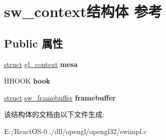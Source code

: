 \hypertarget{structsw__context}{}\section{sw\+\_\+context结构体 参考}
\label{structsw__context}
\subsection*{Public 属性}
\begin{DoxyCompactItemize}
\item 
\mbox{\label{structsw__context_ac7b659e59b721fcfaf5437e52c0de933}} 
\hyperlink{interfacestruct}{struct} \hyperlink{structgl__context}{gl\+\_\+context} {\bfseries mesa}
\item 
\mbox{\label{structsw__context_a1dd21bfc8abfb78310ee2a78116e2009}} 
H\+H\+O\+OK {\bfseries hook}
\item 
\mbox{\label{structsw__context_a663b8472923a4c818b051ef575d82e61}} 
\hyperlink{interfacestruct}{struct} \hyperlink{structsw__framebuffer}{sw\+\_\+framebuffer} {\bfseries framebuffer}
\end{DoxyCompactItemize}


该结构体的文档由以下文件生成\+:\begin{DoxyCompactItemize}
\item 
E\+:/\+React\+O\+S-\/0../dll/opengl/opengl32/swimpl.\+c\end{DoxyCompactItemize}

